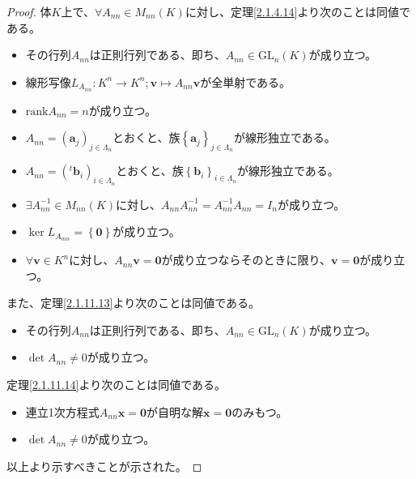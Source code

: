 \documentclass[dvipdfmx]{jsarticle}
\begin{document}
\begin{proof}
体$K$上で、$\forall A_{nn} \in M_{nn}(K)$に対し、定理\ref{2.1.4.14}より次のことは同値である。
\begin{itemize}
\item
  その行列$A_{nn}$は正則行列である、即ち、$A_{nn} \in \mathrm{GL}_{n}(K)$が成り立つ。
\item
  線形写像$L_{A_{nn}}:K^{n} \rightarrow K^{n};\mathbf{v} \mapsto A_{nn}\mathbf{v}$が全単射である。
\item
  ${\mathrm{rank}}A_{nn} = n$が成り立つ。
\item
  $A_{nn} = \left( \mathbf{a}_{j} \right)_{j \in \varLambda_{n}}$とおくと、族$\left\{ \mathbf{a}_j \right\}_{j \in \varLambda_{n} } $が線形独立である。
\item
  $A_{nn} = \left(^{t}\mathbf{b}_{i} \right)_{i \in \varLambda_{n}}$とおくと、族$\left\{ \mathbf{b}_i \right\}_{i \in \varLambda_{n} } $が線形独立である。
\item
  $\exists A_{nn}^{- 1} \in M_{nn}(K)$に対し、$A_{nn}A_{nn}^{- 1} = A_{nn}^{- 1}A_{nn} = I_{n}$が成り立つ。
\item
  $\ker L_{A_{mn}} = \left\{ \mathbf{0} \right\}$が成り立つ。
\item
  $\forall\mathbf{v} \in K^{n}$に対し、$A_{nn}\mathbf{v} = \mathbf{0}$が成り立つならそのときに限り、$\mathbf{v} = \mathbf{0}$が成り立つ。
\end{itemize}
また、定理\ref{2.1.11.13}より次のことは同値である。
\begin{itemize}
\item
  その行列$A_{nn}$は正則行列である、即ち、$A_{nn} \in \mathrm{GL}_{n}(K)$が成り立つ。
\item
  $\det A_{nn} \neq 0$が成り立つ。
\end{itemize}
定理\ref{2.1.11.14}より次のことは同値である。
\begin{itemize}
\item
  連立1次方程式$A_{nn}\mathbf{x} = \mathbf{0}$が自明な解$\mathbf{x} = \mathbf{0}$のみもつ。
\item
  $\det A_{nn} \neq 0$が成り立つ。
\end{itemize}
以上より示すべきことが示された。
\end{proof}
\end{document}

